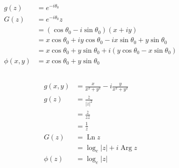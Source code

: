 \documentclass{article}
\newcommand{\Arg}{\operatorname{Arg}}
\newcommand{\Ln}{\operatorname{Ln}}
\begin{document}
\subsubsection{}

\begin{align*}
  g(z)       & = e^{-i \theta_0}                                                           \\
  G(z)       & = e^{-i \theta_0} z                                                         \\
             & = (\cos \theta_0 - i \sin \theta_0) (x + i y)                               \\
             & = x \cos \theta_0 + i y \cos \theta_0 - i x \sin \theta_0 + y \sin \theta_0 \\
             & = x \cos \theta_0 + y \sin \theta_0 + i (y \cos \theta_0 - x \sin \theta_0) \\
  \phi(x, y) & = x \cos \theta_0 + y \sin \theta_0                                         \\
\end{align*}

\setcounter{subsubsection}{2}
\subsubsection{}

\begin{align*}
  g(x, y) & = \frac{x}{x^2 + y^2} - i \frac{y}{x^2 + y^2} \\
  g(z)    & = \frac{\overline{z}}{|z|^2}                  \\
          & = \frac{\overline{z}}{z \overline{z}}         \\
          & = \frac{1}{z}                                 \\
  G(z)    & = \Ln z                                       \\
          & = \log_e |z| + i \Arg z                       \\
  \phi(z) & = \log_e |z|
\end{align*}

\setcounter{subsubsection}{4}
\subsubsection{}
\end{document}
